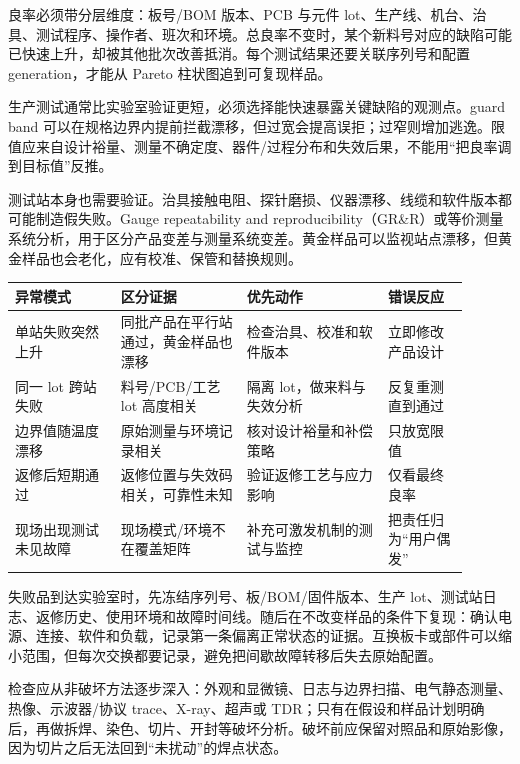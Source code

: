 良率必须带分层维度：板号/BOM 版本、PCB 与元件 lot、生产线、机台、治具、测试程序、操作者、班次和环境。总良率不变时，某个新料号对应的缺陷可能已快速上升，却被其他批次改善抵消。每个测试结果还要关联序列号和配置 generation，才能从 Pareto 柱状图追到可复现样品。


生产测试通常比实验室验证更短，必须选择能快速暴露关键缺陷的观测点。guard band 可以在规格边界内提前拦截漂移，但过宽会提高误拒；过窄则增加逃逸。限值应来自设计裕量、测量不确定度、器件/过程分布和失效后果，不能用“把良率调到目标值”反推。

测试站本身也需要验证。治具接触电阻、探针磨损、仪器漂移、线缆和软件版本都可能制造假失败。Gauge repeatability and reproducibility（GR\&R）或等价测量系统分析，用于区分产品变差与测量系统变差。黄金样品可以监视站点漂移，但黄金样品也会老化，应有校准、保管和替换规则。

\begin{longtable}{L{0.21\linewidth}L{0.25\linewidth}L{0.28\linewidth}L{0.16\linewidth}}
\toprule
异常模式 & 区分证据 & 优先动作 & 错误反应 \\
\midrule
单站失败突然上升 & 同批产品在平行站通过，黄金样品也漂移 & 检查治具、校准和软件版本 & 立即修改产品设计 \\\tablerowrule
同一 lot 跨站失败 & 料号/PCB/工艺 lot 高度相关 & 隔离 lot，做来料与失效分析 & 反复重测直到通过 \\\tablerowrule
边界值随温度漂移 & 原始测量与环境记录相关 & 核对设计裕量和补偿策略 & 只放宽限值 \\\tablerowrule
返修后短期通过 & 返修位置与失效码相关，可靠性未知 & 验证返修工艺与应力影响 & 仅看最终良率 \\\tablerowrule
现场出现测试未见故障 & 现场模式/环境不在覆盖矩阵 & 补充可激发机制的测试与监控 & 把责任归为“用户偶发” \\
\bottomrule
\end{longtable}


失败品到达实验室时，先冻结序列号、板/BOM/固件版本、生产 lot、测试站日志、返修历史、使用环境和故障时间线。随后在不改变样品的条件下复现：确认电源、连接、软件和负载，记录第一条偏离正常状态的证据。互换板卡或部件可以缩小范围，但每次交换都要记录，避免把间歇故障转移后失去原始配置。

检查应从非破坏方法逐步深入：外观和显微镜、日志与边界扫描、电气静态测量、热像、示波器/协议 trace、X-ray、超声或 TDR；只有在假设和样品计划明确后，再做拆焊、染色、切片、开封等破坏分析。破坏前应保留对照品和原始影像，因为切片之后无法回到“未扰动”的焊点状态。

